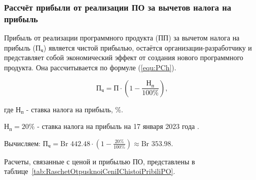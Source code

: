\subsubsection*{Рассчёт прибыли от реализации ПО за вычетов налога на прибыль}

Прибыль от реализации программного продукта (ПП) за вычетом налога на прибыль ($\text{П}_\text{ч}$)
является чистой прибылью,
остаётся организации-разработчику
и представляет собой экономический эффект от создания нового программного продукта.
Она рассчитывается по формуле (\ref{equ:PCh}).

\begin{equation}
    \label{equ:PCh}
    \text{П}_\text{ч} = \text{П} \cdot ( 1 - \frac{ \text{Н}_\text{п} }{ 100\% }) \text{,}
\end{equation}

где $\text{Н}_\text{п}$ - ставка налога на прибыль, \%.

$\text{Н}_\text{п} = 20\%$ - ставка налога на прибыль на 17 января 2023 года \cite{economicStavkaNalogaNaPripil}.

Вычисляем: $\text{П}_\text{ч} = \text{Br } 442.48 \cdot ( 1 - \frac{ 20\% }{ 100\% }) \approx \text{Br } 353.98$.

Расчеты, связанные с ценой и прибылью ПО, представлены в таблице~\ref{tab:RaschetOtpusknoiCeniIChistoiPribiliPO}.

